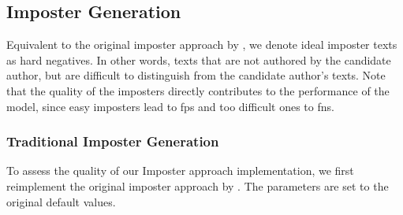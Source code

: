 \subsection{Imposter Generation}
\label{subsec:imposter_generation}

Equivalent to the original imposter approach by \citet{koppel_determining_2014}, we denote ideal imposter texts as hard negatives.
In other words, texts that are not authored by the candidate author, but are difficult to distinguish from the candidate author's texts.
Note that the quality of the imposters directly contributes to the performance of the model, 
since easy imposters lead to \acp{fp} and too difficult ones to \acp{fn}.

\subsubsection{Traditional Imposter Generation}
\label{subsubsec:traditional_imposter_generation}

To assess the quality of our Imposter approach implementation, we first reimplement the original imposter approach by \citet{koppel_determining_2014}.
The parameters are set to the original default values.


